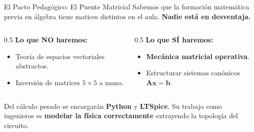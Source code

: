 \documentclass[aspectratio=169]{beamer}
\begin{document}
\begin{frame}{El Pacto Pedagógico: El Puente Matricial}
    Sabemos que la formación matemática previa en álgebra tiene matices distintos en el aula. \textbf{Nadie está en desventaja.}
    
    \vspace{0.5cm}
    \begin{columns}
        \begin{column}{0.5\textwidth}
            \textbf{Lo que NO haremos:}
            \begin{itemize}
                \item Teoría de espacios vectoriales abstractos.
                \item Inversión de matrices $5\times 5$ a mano.
            \end{itemize}
        \end{column}
        \begin{column}{0.5\textwidth}
            \textbf{Lo que SÍ haremos:}
            \begin{itemize}
                \item \textbf{Mecánica matricial operativa}.
                \item Estructurar sistemas canónicos $\mathbf{A}\mathbf{x} = \mathbf{b}$.
            \end{itemize}
        \end{column}
    \end{columns}
    
    \vspace{0.5cm}
    Del cálculo pesado se encargarán \textbf{Python} y \textbf{LTSpice}. Su trabajo como ingenieros es \textbf{modelar la física correctamente} extrayendo la topología del circuito.
\end{frame}
\end{document}
